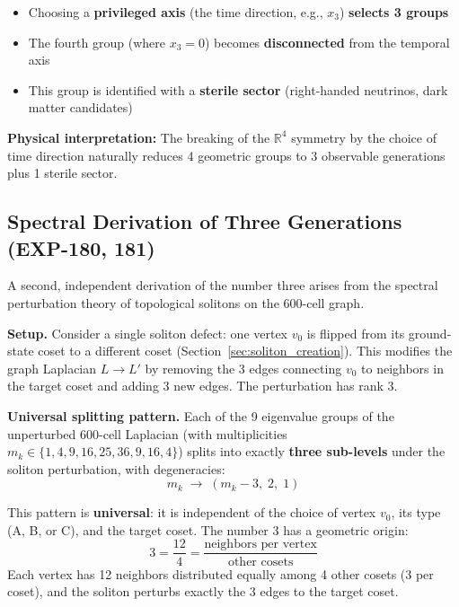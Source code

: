 \documentclass[12pt,a4paper]{article}
\begin{document}
\begin{itemize}
    \item Choosing a \textbf{privileged axis} (the time direction, e.g., $x_3$) \textbf{selects 3 groups}
    \item The fourth group (where $x_3 = 0$) becomes \textbf{disconnected} from the temporal axis
    \item This group is identified with a \textbf{sterile sector} (right-handed neutrinos, dark matter candidates)
\end{itemize}

\textbf{Physical interpretation:} The breaking of the $\mathbb{R}^4$ symmetry by the choice of time direction naturally reduces 4 geometric groups to 3 observable generations plus 1 sterile sector.

\subsection{Spectral Derivation of Three Generations (EXP-180, 181)}
\label{sec:three_splitting}

A second, independent derivation of the number three arises from the spectral perturbation theory of topological solitons on the 600-cell graph.

\textbf{Setup.} Consider a single soliton defect: one vertex $v_0$ is flipped from its ground-state coset to a different coset (Section~\ref{sec:soliton_creation}). This modifies the graph Laplacian $L \to L'$ by removing the 3 edges connecting $v_0$ to neighbors in the target coset and adding 3 new edges. The perturbation has rank 3.

\textbf{Universal splitting pattern.} Each of the 9 eigenvalue groups of the unperturbed 600-cell Laplacian (with multiplicities $m_k \in \{1, 4, 9, 16, 25, 36, 9, 16, 4\}$) splits into exactly \textbf{three sub-levels} under the soliton perturbation, with degeneracies:
\begin{equation}
\boxed{m_k \;\to\; (m_k - 3,\; 2,\; 1)}
\end{equation}

This pattern is \textbf{universal}: it is independent of the choice of vertex $v_0$, its type (A, B, or C), and the target coset. The number 3 has a geometric origin:
\begin{equation}
3 = \frac{12}{4} = \frac{\text{neighbors per vertex}}{\text{other cosets}}
\end{equation}
Each vertex has 12 neighbors distributed equally among 4 other cosets (3 per coset), and the soliton perturbs exactly the 3 edges to the target coset.
\end{document}
